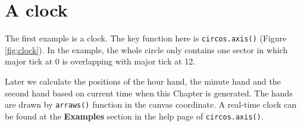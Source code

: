 \documentclass[]{book}
\theoremstyle{definition}
\theoremstyle{definition}
\theoremstyle{remark}
\begin{document}
\section{A clock}\label{a-clock}

The first example is a clock. The key function here is
\texttt{circos.axis()} (Figure \ref{fig:clock}). In the example, the
whole circle only contains one sector in which major tick at 0 is
overlapping with major tick at 12.

Later we calculate the positions of the hour hand, the minute hand and
the second hand based on current time when this Chapter is generated.
The hands are drawn by \texttt{arraws()} function in the canvas
coordinate. A real-time clock can be found at the \textbf{Examples}
section in the help page of \texttt{circos.axis()}.
\end{document}
